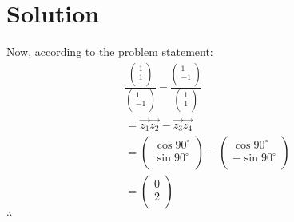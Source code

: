 \documentclass[journal,12pt,twocolumn]{IEEEtran}
\begin{document}
\section{Solution}
Now, according to the problem statement:\\
\begin{align}
\frac{\begin{pmatrix}
      1 \\ 
      1 \\
      \end{pmatrix}}{\begin{pmatrix}
      1 \\ 
      -1 \\
      \end{pmatrix}} - \frac{\begin{pmatrix}
      1 \\ 
      -1 \\
      \end{pmatrix}}{\begin{pmatrix}
      1 \\ 
      1 \\
      \end{pmatrix}} \\
      = \vec{z_1} \vec{z_2} - \vec{z_3} \vec{z_4}\\
      = \begin{pmatrix}
      \cos90^{\circ} \\ 
      \sin90^{\circ} \\
      \end{pmatrix} - \begin{pmatrix}
      \cos90^{\circ} \\ 
      -\sin90^{\circ} \\
      \end{pmatrix} \\
      = \begin{pmatrix}
      0 \\ 
      2 \\
      \end{pmatrix}
\end{align} 
$\therefore$ 
\end{document}

